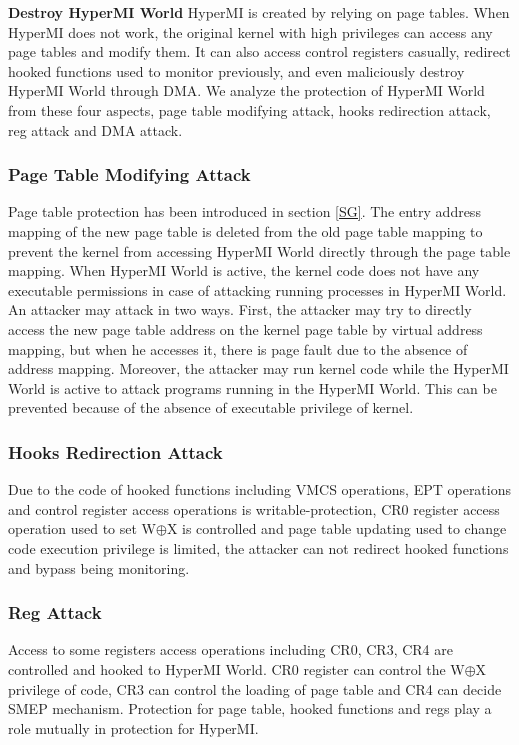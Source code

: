 \documentclass[conference]{IEEEtran}
\begin{document}
\textbf{Destroy HyperMI World}
HyperMI is created by relying on page tables. When HyperMI does not work, the original kernel with high privileges can access any page tables and modify them. It can also access control registers casually, redirect hooked functions used to monitor previously, and even maliciously destroy HyperMI World through DMA. We analyze the protection of HyperMI World from these four aspects, page table modifying attack, hooks redirection attack, reg attack and DMA attack.

\subsubsection{Page Table Modifying Attack}

Page table protection has been introduced in section \ref{SG}. The entry address mapping of the new page table is deleted from the old page table mapping to prevent the kernel from accessing HyperMI World directly through the page table mapping. When HyperMI World is active, the kernel code does not have any executable permissions in case of attacking running processes in HyperMI World. An attacker may attack in two ways.
First, the attacker may try to directly access the new page table address on the kernel page table by virtual address mapping, but when he accesses it, there is page fault due to the absence of address mapping.
Moreover, the attacker may run kernel code while the HyperMI World is active to attack programs running in the HyperMI World. This can be prevented because of the absence of executable privilege of kernel.


\subsubsection{Hooks Redirection Attack}

Due to the code of hooked functions including VMCS operations, EPT operations and  control register access operations is writable-protection, CR0 register access operation used to set W$\oplus${X} is controlled and page table updating used to change code execution privilege is limited, the attacker can not redirect hooked functions and bypass being monitoring.

\subsubsection{Reg Attack}

Access to some registers access operations including CR0, CR3, CR4 are controlled and hooked to HyperMI World. CR0 register can control the W$\oplus${X} privilege of code, CR3 can control the loading of page table and CR4 can decide SMEP mechanism. Protection for page table, hooked functions and regs play a role mutually in protection for HyperMI. 
\end{document}
